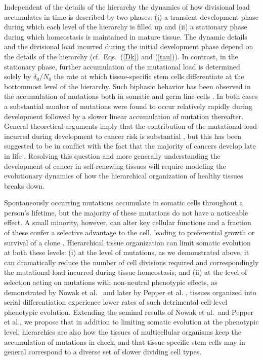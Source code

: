 \documentclass[aps,singlecolumn]{revtex4-1}
\begin{document}
Independent of the details of the hierarchy the dynamics of how
divisional load accumulates in time is described by two phases:
(i) a transient development phase during which each level of the
hierarchy is filled up and
(ii) a stationary phase during which homeostasis is maintained in
mature tissue.
The dynamic details and the divisional load incurred during the initial
development phase depend on the details of the hierarchy (cf.\
Eqs.~(\ref{Dk}) and (\ref{tau})). In contrast, in the stationary
phase, further accumulation of the mutational load is determined solely
by $\delta_0/N_0$ the rate at which tissue-specific stem cells differentiate at
the bottommost level of the hierarchy. Such biphasic behavior has been
observed in the accumulation of mutations both in somatic
\cite{Rozhok:2015} and germ line cells
\cite{Kong:2012,Gao:2016,Rahbari:2016}. In both cases a substantial
number of mutations were found to occur relatively rapidly during
development followed by a slower linear accumulation of mutation
thereafter. General theoretical arguments imply that
the contribution of the mutational load incurred during development to
cancer risk is substantial \cite{Frank:2003}, but this has been suggested to be in
conflict with the fact that the majority of cancers develop late in
life \cite{Rozhok:2015,Rozhok:2016}. Resolving this question and more
generally understanding the development of cancer in self-renewing
tissues will require modeling the evolutionary dynamics of how the
hierarchical organization of healthy tissues breaks down.

Spontaneously occurring mutations accumulate in somatic
cells throughout a person's lifetime, but the majority of these
mutations do not have a noticeable effect. A small minority,
however, can alter key cellular functions and a fraction of
these confer a selective advantage to the cell, leading to preferential
growth or survival of a clone \cite{Martincorena:2015rev}. Hierarchical tissue
organization can limit somatic evolution at both these levels: (i) at the
level of mutations, as we
demonstrated above, it can dramatically reduce the number of cell
divisions required and correspondingly the mutational load incurred
during tissue homeostasis; and (ii) at the level of selection acting
on mutations with non-neutral phenotypic effects, as demonstrated by
Nowak et al.\ \cite{Nowak:2003} and later by Pepper et al. \cite{Pepper:2007},
tissues organized into serial differentiation
experience lower rates of such detrimental cell-level phenotypic evolution.
Extending the seminal results of Nowak et al.\ and Pepper et al., we
propose that in addition to limiting somatic evolution at the
phenotypic level, hierarchies are also how the tissues of multicellular
organisms
keep the accumulation of mutations in check, and that tissue-specific
stem cells may in general correspond to a diverse set of slower
dividing cell types.
\end{document}

